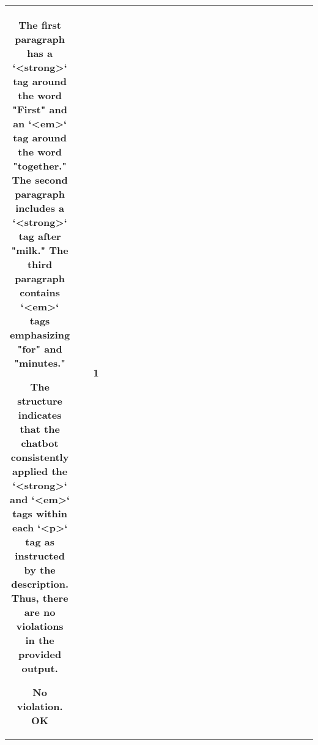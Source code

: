 \begin{table}[h!]
\begin{tabular}{|c|c|c|c|c|c|c|c|c|c|}
The first paragraph has a `<strong>` tag around the word "First" and an `<em>` tag around the word "together." The second paragraph includes a `<strong>` tag after "milk." The third paragraph contains `<em>` tags emphasizing "for" and "minutes."

The structure indicates that the chatbot consistently applied the `<strong>` and `<em>` tags within each `<p>` tag as instructed by the description. Thus, there are no violations in the provided output.

No violation.
OK & 1\\
\hline
1bfa647 & b70fdc4 &  &  & llama3.2:1b & First, mix the flour and sugar together. Then, add the eggs and milk. Bake the mixture for 30 minutes. & Here is the reformatted paragraph with at least three `<p>` tags, one `<strong>` tag, and multiple `<em>` tags inside each `<p>` tag:

**<p><strong>First, mix</strong> the <em>sugar</em> and <em>flour</em> together.</p>
<p><strong>Then, add</strong> the <em>eggs</em> and <em>milk</em></p>
<p><strong>Bake</strong> the mixture for 30 minutes.</p>

Now it should look like this:

< p >First, mix the sugar and flour together.< /p >
< p >Then, add the eggs and milk.< /p >
< p >Bake the mixture for 30 minutes.< /p > & ok & The chatbot's output has been evaluated based on the compliance guidelines provided:

1. The output contains three `<p>` tags with content inside them, which satisfies the requirement of having at least three `<p>` tags.
2. Each `<p>` tag contains one `<strong>` tag, which complies with the guideline to include one `<strong>` tag per `<p>` tag.
3. Each `<p>` tag also contains multiple `<em>` tags, adhering to the requirement of having multiple `<em>` tags per `<p>` tag.

The description provided in the output also mentions what it should look like when formatted, but this does not affect the compliance with the primary requirements stated.

Based on the explicit compliance checks mentioned without needing input-specific validations, the chatbot's output adheres to the description provided.

There is no violation found when considering compliance with the description.


\end{tabular}
\end{table}
